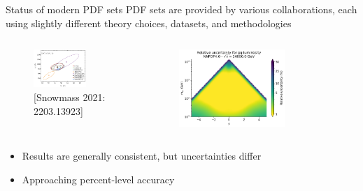 \documentclass[aspectratio=169, 8pt,t]{beamer}
\begin{document}
\begin{frame}{Status of modern PDF sets}
  PDF sets are provided by various collaborations, each using slightly different theory choices, datasets, and methodologies
  \begin{columns}
    \begin{column}{0.49\textwidth}
      \begin{figure}
        \includegraphics[width=0.7\textwidth]{Httbar_xsec}
        \caption*{\color{gray} \footnotesize [Snowmass 2021: 2203.13923]}
      \end{figure}
    \end{column}
    \begin{column}{0.49\textwidth}
      \begin{figure}
        \includegraphics[width=0.7\textwidth]{gqlumi}
      \end{figure}
    \end{column}
  \end{columns}
  \begin{itemize}
  \item Results are generally consistent, but uncertainties differ
  \item Approaching percent-level accuracy
  \end{itemize}
\end{frame}
\end{document}
